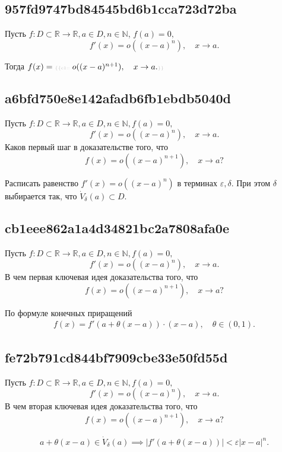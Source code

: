 \documentclass[11pt, a5paper]{article}
\newenvironment{note}[1]{\goodbreak\par\subsection{\hfill \color{lightgray}\tiny #1}}{}
\newenvironment{cloze}[2][\ldots]{\begin{leftbar}}{\end{leftbar}}
\newenvironment{icloze}[2][\ldots]{%
  \ignorespaces\text{\tiny \color{lightgray} \{\{c#2:: }%
}{%
  \text{\tiny \color{lightgray}\}\}}\unskip%
}
\begin{document}
\begin{note}{957fd9747bd84545bd6b1cca723d72ba}
    Пусть \( f : D \subset \mathbb R \to \mathbb R, a \in D, n \in \mathbb N \), \begin{icloze}{2}\(f(a) = 0, \)
    \[
        f'(x) = o((x - a)^{n} ), \quad x \to a.
    \]\end{icloze}

    Тогда \( f(x) = \begin{icloze}{1}o((x - a)^{n + 1}), \quad x \to a.\end{icloze} \)
\end{note}

\begin{note}{a6bfd750e8e142afadb6fb1ebdb5040d}
    Пусть \( f : D \subset \mathbb R \to \mathbb R, a \in D, n \in \mathbb N, f(a) = 0, \)
    \[
        f'(x) = o((x - a)^{n} ), \quad x \to a.
    \]
    Каков первый шаг в доказательстве того, что
    \[
        f(x) = o((x - a)^{n + 1}), \quad x \to a?
    \]

    \begin{cloze}{1}
        Расписать равенство \( f'(x) = o((x - a)^{n} ) \) в терминах \( \varepsilon, \delta. \)
        При этом \( \delta \) выбирается так, что \( \dot V_{\delta}(a) \subset D. \)
    \end{cloze}
\end{note}

\begin{note}{cb1eee862a1a4d34821bc2a7808afa0e}
    Пусть \( f : D \subset \mathbb R \to \mathbb R, a \in D, n \in \mathbb N, f(a) = 0, \)
    \[
        f'(x) = o((x - a)^{n} ), \quad x \to a.
    \]
    В чем первая ключевая идея доказательства того, что
    \[
        f(x) = o((x - a)^{n + 1}), \quad x \to a?
    \]

    \begin{cloze}{1}
        По формуле конечных приращений
        \[
            \begin{gathered}
                f(x) = f'(a + \theta(x - a)) \cdot (x - a), \quad \theta \in (0, 1).
            \end{gathered}
        \]
    \end{cloze}
\end{note}

\begin{note}{fe72b791cd844bf7909cbe33e50fd55d}
    Пусть \( f : D \subset \mathbb R \to \mathbb R, a \in D, n \in \mathbb N, f(a) = 0, \)
    \[
        f'(x) = o((x - a)^{n} ), \quad x \to a.
    \]
    В чем вторая ключевая идея доказательства того, что
    \[
        f(x) = o((x - a)^{n + 1}), \quad x \to a?
    \]

    \begin{cloze}{1}
        \[
            a + \theta(x - a) \in \dot V_{\delta} (a) \implies |f'(a + \theta(x - a))| < \varepsilon|x - a|^{n}.
        \]
    \end{cloze}
\end{note}
\end{document}
